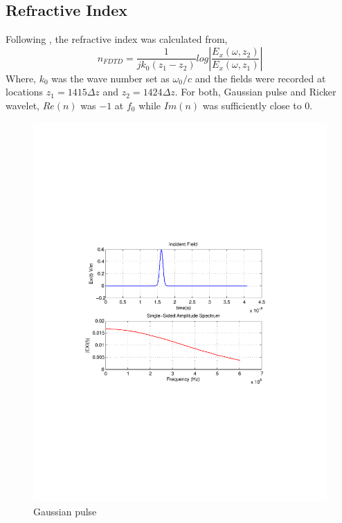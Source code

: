 \subsection{Refractive Index}
Following \cite{DNG-Ehud-Ziol}, the refractive index was calculated from,
\begin{equation}
n_{FDTD} = \dfrac{1}{jk_0(z_1-z_2)}log\left|\dfrac{E_x(\omega,z_2)}{E_x(\omega,z_1)}\right|
\label{Refractive-Index-FDTD}
\end{equation}
Where, $k_0$ was the wave number set as $\omega_0/c$ and the fields were recorded at locations $z_1=1415\Delta z$ and $z_2=1424\Delta z$. For both, Gaussian pulse and Ricker wavelet, $Re(n)$ was $-1$ at $f_0$ while $Im(n)$ was sufficiently close to $0$.
\begin{figure}[H]
\centering
\includegraphics[scale=0.8, trim=3.5cm 8.7cm 4.5cm 8.85cm, clip]{FigCh03_IncidentFieldGaussian.pdf}
\caption{Gaussian pulse}
\label{1DDNG-IncidentField-Gaussian}
\end{figure}
